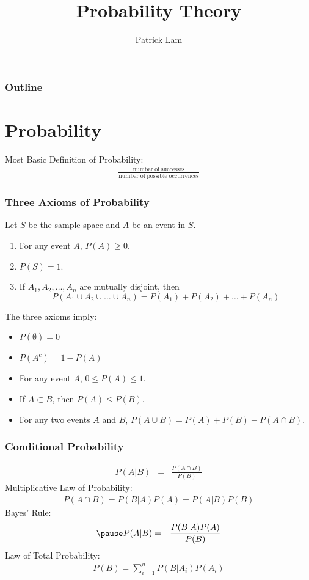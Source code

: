 \documentclass{beamer}
\author{Patrick Lam}
\title{Probability Theory}
\date{}
\begin{document}
\newcommand{\red}{\textcolor{red}}
\newcommand{\blue}{\textcolor{blue}}
\newcommand{\purple}{\textcolor{purple}}

\frame{\titlepage}

\begin{frame}
\frametitle{Outline}
\tableofcontents
\end{frame}


\section{Probability}

\begin{frame}
Most Basic Definition of Probability:
\pause
\bigskip
\begin{eqnarray*}
\frac{\mathrm{number \; of \; successes}}{\mathrm{number \; of \; possible \; occurrences}}
\end{eqnarray*}
\end{frame}

\begin{frame}
\frametitle{Three Axioms of Probability}
\pause
Let $S$ be the sample space and $A$ be an event in $S$.
\pause
\medskip
\begin{enumerate}
\item For any event $A$, $P(A) \ge 0$.
\pause
\item $P(S) = 1$.
\pause
\item If $A_1, A_2, \dots, A_n$ are mutually disjoint, then
\begin{equation*}
P(A_1 \cup A_2 \cup \dots \cup A_n) = P(A_1) + P(A_2) + \dots + P(A_n)
\end{equation*}
\end{enumerate}
\pause
The three axioms imply:
\pause
\begin{itemize}
\item $P(\emptyset) = 0$
\pause
\item $P(A^c) = 1 - P(A)$
\pause
\item For any event $A$, $0 \le P(A) \le 1$.
\pause
\item If $A \subset B$, then $P(A) \le P(B)$.
\pause
\item For any two events $A$ and $B$, $P(A \cup B) = P(A) + P(B) - P(A
\cap B)$.
\end{itemize}
\end{frame}

\begin{frame}
\frametitle{Conditional Probability}
\pause
\begin{eqnarray*}
P(A|B) &=& \frac{P(A \cap B)}{P(B)} 
\end{eqnarray*}
\pause
Multiplicative Law of Probability:
\pause
\begin{eqnarray*}
P(A \cap B) = P(B|A) P(A) = P(A|B) P(B)
\end{eqnarray*}
\pause
Bayes' Rule:
\begin{eqnarray*}
\pause
P(A|B) &=& \frac{P(B|A) P(A)}{P(B)}
\end{eqnarray*}
\pause
Law of Total Probability:
\pause
\begin{eqnarray*}
P(B) = \sum_{i=1}^n P(B|A_i) P(A_i)
\end{eqnarray*}
\end{frame}
\end{document}
